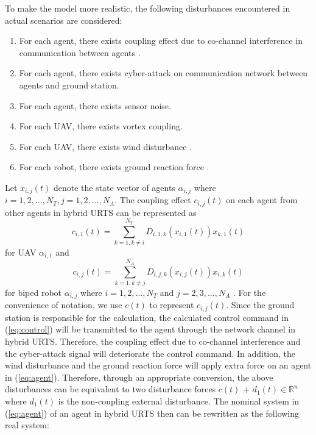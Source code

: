 \documentclass[journal,12pt,onecolumn,draftclsnofoot,]{IEEEtran}
\begin{document}
To make the model more realistic, the following disturbances encountered in actual scenarios are considered:
\begin{enumerate}
    \item For each agent, there exists coupling effect due to co-channel interference in communication between agents \cite{9834947}.
    \item For each agent, there exists cyber-attack on communication network between agents and ground station.
    \item For each agent, there exists sensor noise.
    \item For each UAV, there exists vortex coupling.
    \item For each UAV, there exists wind disturbance \cite{9075385}.
    \item For each robot, there exists ground reaction force \cite{chen2013human}. 
\end{enumerate}
Let $x_{i,j}(t)$ denote the state vector of agents $\alpha_{i,j}$ where $i=1,2,\dots,N_T, j=1,2,\dots,N_A$. The coupling effect $c_{i,j}(t)$ on each agent from other agents in hybrid URTS can be represented as \begin{equation} \label{eq:UAV couple}
    c_{i,1}(t) = \sum_{k = 1, k \neq i}^{N_T}D_{i, 1, k}(x_{i, 1}(t))x_{k, 1}(t)
\end{equation} for UAV $\alpha_{i, 1}$ and \begin{equation} \label{eq:robot couple}
    c_{i,j}(t) = \sum_{k = 1, k \neq j}^{N_A}D_{i, j, k}(x_{i, j}(t))x_{i, k}(t)
\end{equation} for biped robot $\alpha_{i, j}$ where $i=1,2,\dots,N_T$ and $j=2,3,\dots,N_A$ \cite{9834947}. For the convenience of notation, we use $c(t)$ to represent $c_{i,j}(t)$. Since the ground station is responsible for the calculation, the calculated control command in (\ref{eq:control}) will be transmitted to the agent through the network channel in hybrid URTS. Therefore, the coupling effect due to co-channel interference and the cyber-attack signal will deteriorate the control command. In addition, the wind disturbance and the ground reaction force will apply extra force on an agent in (\ref{eq:agent}). Therefore, through an appropriate conversion, the above disturbances can be equivalent to two disturbance forces $c(t)$ + $d_1(t)\in\mathbb{R}^n$ where $d_1(t)$ is the non-coupling external disturbance. The nominal system in (\ref{eq:agent}) of an agent in hybrid URTS then can be rewritten as the following real system:
\end{document}
